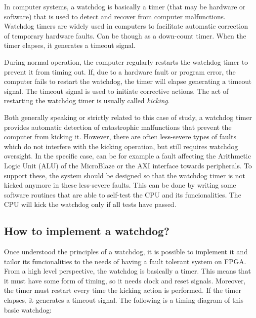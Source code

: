 In computer systems, a watchdog is basically a timer (that may be hardware or software) that is used to detect and recover from computer malfunctions. Watchdog timers are widely used in computers to facilitate automatic correction of temporary hardware faults. Can be though as a down-count timer. When the timer elapses, it generates a timeout signal.\bigskip

During normal operation, the computer regularly restarts the watchdog timer to prevent it from timing out. If, due to a hardware fault or program error, the computer fails to restart the watchdog, the timer will elapse generating a timeout signal. The timeout signal is used to initiate corrective actions. The act of restarting the watchdog timer is usually called \textit{kicking}. \bigskip

Both generally speaking or strictly related to this case of study, a watchdog timer provides automatic detection of catastrophic malfunctions that prevent the computer from kicking it. However, there are often less-severe types of faults which do not interfere with the kicking operation, but still requires watchdog oversight. In the specific case, can be for example a fault affecting the Arithmetic Logic Unit (ALU) of the MicroBlaze or the AXI interface towards peripherals. To support these, the system should be designed so that the watchdog timer is not kicked anymore in these less-severe faults. This can be done by writing some software routines that are able to self-test the CPU and its funcionalities. The CPU will kick the watchdog only if all tests have passed.


\subsection{How to implement a watchdog?}
\label{sec:wd_impl}

Once understood the principles of a watchdog, it is possible to implement it and tailor its funcionalities to the needs of having a fault tolerant system on FPGA. From a high level perspective, the watchdog is basically a timer. This means that it must have some form of timing, so it needs clock and reset signals. Moreover, the timer must restart every time the kicking action is performed. If the timer elapses, it generates a timeout signal. The following is a timing diagram of this basic watchdog:

